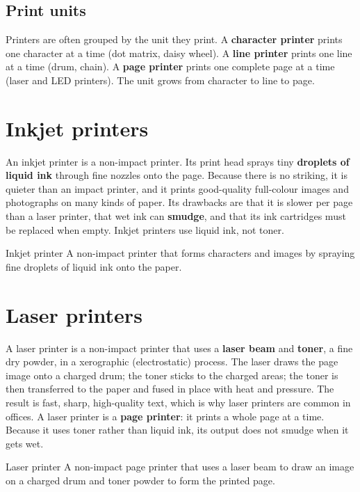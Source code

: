 \subsection*{Print units}
Printers are often grouped by the unit they print. A \textbf{character
printer} prints one character at a time (dot matrix, daisy wheel). A
\textbf{line printer} prints one line at a time (drum, chain). A \textbf{page
printer} prints one complete page at a time (laser and LED printers). The
unit grows from character to line to page.

\section{Inkjet printers}
An inkjet printer is a non-impact printer. Its print head sprays tiny
\textbf{droplets of liquid ink} through fine nozzles onto the page. Because
there is no striking, it is quieter than an impact printer, and it prints
good-quality full-colour images and photographs on many kinds of paper. Its
drawbacks are that it is slower per page than a laser printer, that wet ink
can \textbf{smudge}, and that its ink cartridges must be replaced when empty.
Inkjet printers use liquid ink, not toner.

\begin{definitionbox}{Inkjet printer}
A non-impact printer that forms characters and images by spraying fine
droplets of liquid ink onto the paper.
\end{definitionbox}

\section{Laser printers}
A laser printer is a non-impact printer that uses a \textbf{laser beam} and
\textbf{toner}, a fine dry powder, in a xerographic (electrostatic) process.
The laser draws the page image onto a charged drum; the toner sticks to the
charged areas; the toner is then transferred to the paper and fused in place
with heat and pressure. The result is fast, sharp, high-quality text, which
is why laser printers are common in offices. A laser printer is a
\textbf{page printer}: it prints a whole page at a time. Because it uses
toner rather than liquid ink, its output does not smudge when it gets wet.

\begin{definitionbox}{Laser printer}
A non-impact page printer that uses a laser beam to draw an image on a
charged drum and toner powder to form the printed page.
\end{definitionbox}

